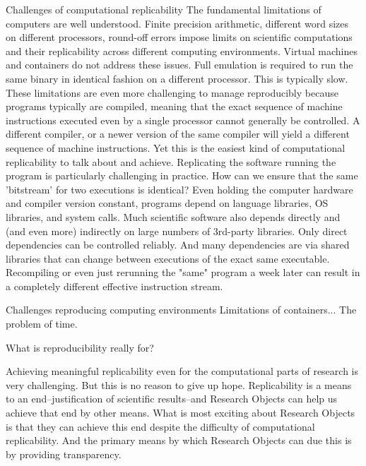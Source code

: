 		Challenges of computational replicability
			The fundamental limitations of computers are well understood.
				Finite precision arithmetic, different word sizes on different processors, round-off errors impose limits on scientific computations and 
					their replicability across different computing environments.
				Virtual machines and containers do not address these issues. Full emulation is required to run the same binary in identical fashion
					on a different processor.  This is typically slow.
				These limitations are even more challenging to manage reproducibly because programs typically are compiled, meaning that the
					exact sequence of machine instructions executed even by a single processor cannot generally be controlled.  A different compiler,
					or a newer version of the same compiler will yield a different sequence of machine instructions.
				Yet this is the easiest kind of computational replicability to talk about and achieve.
			Replicating the software running the program is particularly challenging in practice.
				How can we ensure that the same 'bitstream' for two executions is identical?
				Even holding the computer hardware and compiler version constant, programs depend on language libraries, OS libraries, and system calls.
				Much scientific software also depends directly and (and even more) indirectly on large numbers of 3rd-party libraries.
				Only direct dependencies can be controlled reliably.  And many dependencies are via shared libraries that can change between executions
				of the exact same executable.
				Recompiling or even just rerunning the "same" program a week later can result in a completely different effective instruction stream.
				
		Challenges reproducing computing environments
			Limitations of containers...
			The problem of time.

	What is reproducibility really for?
	
		Achieving meaningful replicability even for the computational parts of research is very challenging.
		But this is no reason to give up hope.  
		Replicability is a means to an end--justification of scientific results--and Research Objects can help us achieve that end by other means.
		What is most exciting about Research Objects is that they can achieve this end despite the difficulty of computational replicability.
		And the primary means by which Research Objects can due this is by providing transparency.